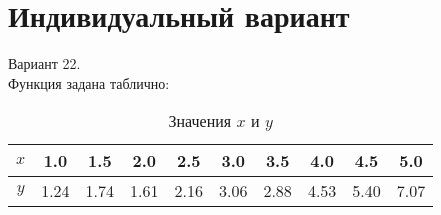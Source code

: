 \documentclass[a4paper, 14pt]{extarticle}
\begin{document}
\section{Индивидуальный вариант}
\begin{justify}
	Вариант 22. \\
	Функция задана таблично: \\
	\begin{table}[h!]
		\centering
		\begin{tabular}{|c|ccccccccc|}
			\hline
			$x$ & 1.0 & 1.5 & 2.0 & 2.5 & 3.0 & 3.5 & 4.0 & 4.5 & 5.0 \\
			\hline
			$y$ & 1.24 & 1.74 & 1.61 & 2.16 & 3.06 & 2.88 & 4.53 & 5.40 & 7.07 \\
			\hline
		\end{tabular}
		\caption{Значения $x$ и $y$}
	\end{table}
	
	
\end{justify}
\pagebreak
\end{document}
